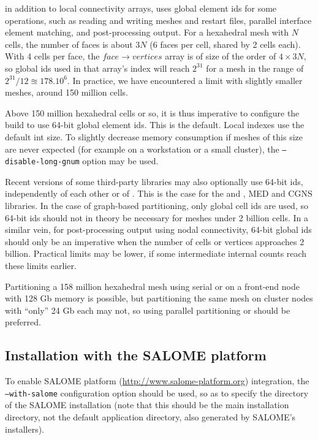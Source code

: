 \documentclass[a4paper,10pt,twoside]{csshortdoc}
\begin{document}
in addition to local connectivity arrays, \CS uses global element ids
for some operations, such as reading and writing meshes and restart files,
parallel interface element matching, and post-processing output.
For a hexahedral mesh with $N$ cells,
the number of faces is about $3N$ (6 faces per cell, shared by 2 cells each).
With 4 cells per face, the $face \rightarrow vertices$ array is of size
of the order of $4\times3N$, so global ids used in that array's index
will reach $2^{31}$ for a mesh in the range of $2^{31} / 12 \approxeq 178.10^6$.
In practice, we have encountered a limit with slightly smaller meshes,
around 150 million cells.

Above 150 million hexahedral cells or so, it is thus imperative to configure
the build to use 64-bit global element ids. This is the default.
Local indexes use the default {int} size. To slightly decrease memory
consumption if meshes of this size are never expected (for example on a workstation
or a small cluster), the {\tt --disable-long-gnum} option may be used.

Recent versions of some third-party libraries may also optionally use 64-bit ids,
independently of each other or of \CS.
This is the case for the \scotch and \metis, MED and
CGNS libraries. In the case of graph-based partitioning, only
global cell ids are used, so 64-bit ids should not in theory be necessary
for meshes under 2 billion cells. In a similar vein, for post-processing output
using nodal connectivity, 64-bit global ids should only be an imperative
when the number of cells or vertices approaches 2 billion.
Practical limits may be lower, if some intermediate internal counts
reach these limits earlier.

Partitioning a 158 million hexahedral mesh using serial  or \scotch
on a front-end node with 128 Gb memory is possible,
but partitioning the same mesh on cluster nodes with ``only'' 24 Gb each
may not, so using parallel partitioning \ptscotch or \parmetis
should be preferred.

\subsection{Installation with the SALOME platform\label{sec:config:salome}}

To enable SALOME platform (\url{http://www.salome-platform.org}) integration,
the \texttt{--with-salome} configuration option should be used, so as to
specify the directory of the SALOME installation (note that this should be
the main installation directory, not the default application directory,
also generated by SALOME's installers).
\end{document}
